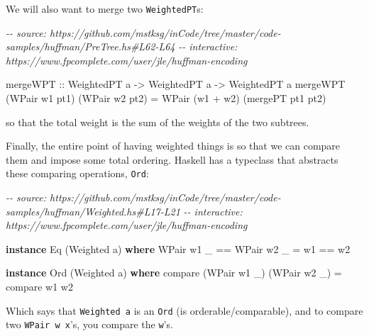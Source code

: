 \documentclass[]{article}
\newenvironment{Shaded}{}{}
\newcommand{\CommentTok}[1]{\textcolor[rgb]{0.38,0.63,0.69}{\textit{#1}}}
\newcommand{\DataTypeTok}[1]{\textcolor[rgb]{0.56,0.13,0.00}{#1}}
\newcommand{\FunctionTok}[1]{\textcolor[rgb]{0.02,0.16,0.49}{#1}}
\newcommand{\KeywordTok}[1]{\textcolor[rgb]{0.00,0.44,0.13}{\textbf{#1}}}
\newcommand{\NormalTok}[1]{#1}
\newcommand{\OperatorTok}[1]{\textcolor[rgb]{0.40,0.40,0.40}{#1}}
\newcommand{\OtherTok}[1]{\textcolor[rgb]{0.00,0.44,0.13}{#1}}
\begin{document}
We will also want to merge two \texttt{WeightedPT}s:

\begin{Shaded}
\begin{Highlighting}[]
\CommentTok{{-}{-} source: https://github.com/mstksg/inCode/tree/master/code{-}samples/huffman/PreTree.hs\#L62{-}L64}
\CommentTok{{-}{-} interactive: https://www.fpcomplete.com/user/jle/huffman{-}encoding}

\OtherTok{mergeWPT ::} \DataTypeTok{WeightedPT}\NormalTok{ a }\OtherTok{{-}\textgreater{}} \DataTypeTok{WeightedPT}\NormalTok{ a }\OtherTok{{-}\textgreater{}} \DataTypeTok{WeightedPT}\NormalTok{ a}
\NormalTok{mergeWPT (}\DataTypeTok{WPair}\NormalTok{ w1 pt1) (}\DataTypeTok{WPair}\NormalTok{ w2 pt2)}
    \OtherTok{=} \DataTypeTok{WPair}\NormalTok{ (w1 }\OperatorTok{+}\NormalTok{ w2) (mergePT pt1 pt2)}
\end{Highlighting}
\end{Shaded}

so that the total weight is the sum of the weights of the two subtrees.

Finally, the entire point of having weighted things is so that we can compare
them and impose some total ordering. Haskell has a typeclass that abstracts
these comparing operations, \texttt{Ord}:

\begin{Shaded}
\begin{Highlighting}[]
\CommentTok{{-}{-} source: https://github.com/mstksg/inCode/tree/master/code{-}samples/huffman/Weighted.hs\#L17{-}L21}
\CommentTok{{-}{-} interactive: https://www.fpcomplete.com/user/jle/huffman{-}encoding}

\KeywordTok{instance} \DataTypeTok{Eq}\NormalTok{ (}\DataTypeTok{Weighted}\NormalTok{ a) }\KeywordTok{where}
    \DataTypeTok{WPair}\NormalTok{ w1 \_ }\OperatorTok{==} \DataTypeTok{WPair}\NormalTok{ w2 \_ }\OtherTok{=}\NormalTok{ w1 }\OperatorTok{==}\NormalTok{ w2}

\KeywordTok{instance} \DataTypeTok{Ord}\NormalTok{ (}\DataTypeTok{Weighted}\NormalTok{ a) }\KeywordTok{where}
    \FunctionTok{compare}\NormalTok{ (}\DataTypeTok{WPair}\NormalTok{ w1 \_) (}\DataTypeTok{WPair}\NormalTok{ w2 \_) }\OtherTok{=} \FunctionTok{compare}\NormalTok{ w1 w2}
\end{Highlighting}
\end{Shaded}

Which says that \texttt{Weighted\ a} is an \texttt{Ord} (is
orderable/comparable), and to compare two \texttt{WPair\ w\ x}'s, you compare
the \texttt{w}'s.
\end{document}
